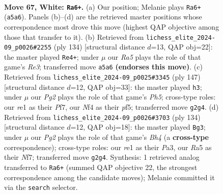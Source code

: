 \documentclass[11pt]{article}
\begin{document}
\clearpage

\begin{figure}[p]\centering
\begin{subfigure}{0.46\textwidth}\centering
\resizebox{\linewidth}{!}{%
\newchessgame
\chessboard[
  setfen={8/8/1k6/RP6/5N2/8/2K3P1/4r3 w - - 3 67},
  showmover=false,
  pgfstyle=straightmove, color=movearrow, markmove={a5-a6}
]}
\caption{}
\end{subfigure}\hfill
\begin{subfigure}{0.46\textwidth}\centering
\resizebox{\linewidth}{!}{%
\newchessgame
\chessboard[
  setfen={8/2K5/5r2/8/3k4/4RP2/8/8 w - - 7 68},
  showmover=false,
  pgfstyle=straightmove, color=movearrow, markmove={e3-e4}
]}
\caption{}
\end{subfigure}
\\[4pt]
\begin{subfigure}{0.46\textwidth}\centering
\resizebox{\linewidth}{!}{%
\newchessgame
\chessboard[
  setfen={8/5p2/8/5P2/7p/1k6/3pr3/3K4 b - - 1 74},
  showmover=false,
  pgfstyle=straightmove, color=movearrow, markmove={h4-h3}
]}
\caption{}
\end{subfigure}\hfill
\begin{subfigure}{0.46\textwidth}\centering
\resizebox{\linewidth}{!}{%
\newchessgame
\chessboard[
  setfen={8/5N2/6k1/1K4P1/7B/P7/8/8 w - - 5 68},
  showmover=false,
  pgfstyle=straightmove, color=movearrow, markmove={h4-g3}
]}
\caption{}
\end{subfigure}
\caption{\textbf{Move 67, White: \texttt{Ra6+}.} (a) Our position; Melanie plays \texttt{Ra6+} (\texttt{a5a6}). Panels (b)--(d) are the retrieved master positions whose correspondence most drove this move (highest QAP objective among those that transfer to it). (b) Retrieved from \texttt{lichess\_elite\_2024-09\_p0026\#2255} (ply 134) [structural distance $d$=13, QAP obj=22]: the master played \texttt{Re4+}; under $\mu$ our \emph{Ra5} plays the role of that game's \emph{Re3}; transferred move \texttt{a5a6} \textbf{(endorses this move)}. (c) Retrieved from \texttt{lichess\_elite\_2024-09\_p0025\#3345} (ply 147) [structural distance $d$=12, QAP obj=33]: the master played \texttt{h3}; under $\mu$ our \emph{Pg2} plays the role of that game's \emph{Ph5}; cross-type roles: our \emph{r}e1 as their \emph{P}f7, our \emph{N}f4 as their \emph{p}f5; transferred move \texttt{g2g4}. (d) Retrieved from \texttt{lichess\_elite\_2024-09\_p0026\#3703} (ply 134) [structural distance $d$=12, QAP obj=18]: the master played \texttt{Bg3}; under $\mu$ our \emph{Pg2} plays the role of that game's \emph{Bh4} (a \textbf{cross-type} correspondence); cross-type roles: our \emph{r}e1 as their \emph{P}a3, our \emph{R}a5 as their \emph{N}f7; transferred move \texttt{g2g4}. Synthesis: 1 retrieved analog transferred to \texttt{Ra6+} (summed QAP objective 22, the strongest correspondence among the candidate moves); Melanie committed it via the \texttt{search} selector.}
\label{fig:thought-m132}
\end{figure}
\end{document}

